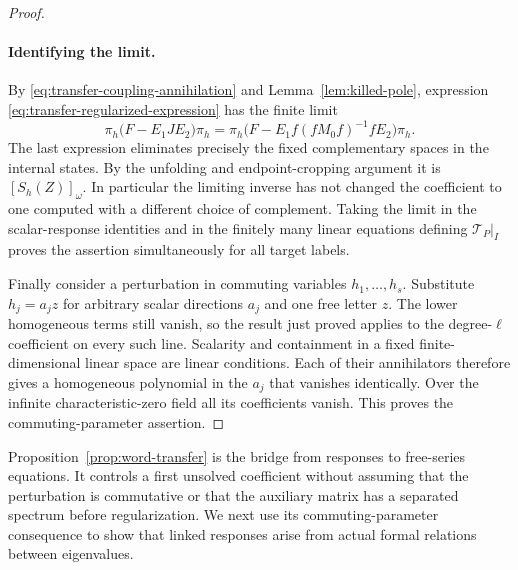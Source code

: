 \begin{proof}
\paragraph{Identifying the limit.}
By \eqref{eq:transfer-coupling-annihilation} and
Lemma~\ref{lem:killed-pole}, expression
\eqref{eq:transfer-regularized-expression} has the finite limit
\[
 \pi_h\bigl(F-E_1JE_2\bigr)\pi_h
 =\pi_h\bigl(F-E_1f(fM_0f)^{-1}fE_2\bigr)\pi_h.
\]
The last expression eliminates precisely the fixed complementary
spaces in the internal states.  By the unfolding and endpoint-cropping
argument it is $[S_h(Z)]_\omega$.  In particular the limiting inverse has
not changed the coefficient to one computed with a different choice of
complement.  Taking the limit in the scalar-response identities and in
the finitely many linear equations defining $\mathcal T_P|_I$ proves
the assertion simultaneously for all target labels.

Finally consider a perturbation in commuting variables $h_1,\ldots,h_s$.
Substitute $h_j=a_jz$ for arbitrary scalar directions $a_j$ and one free
letter $z$.  The lower homogeneous terms still vanish, so the result
just proved applies to the degree-$\ell$ coefficient on every such
line.  Scalarity and containment in a fixed finite-dimensional linear
space are linear conditions.  Each of their annihilators therefore
gives a homogeneous polynomial in the $a_j$ that vanishes identically.
Over the infinite characteristic-zero field all its coefficients vanish.
This proves the commuting-parameter assertion.
\end{proof}

Proposition~\ref{prop:word-transfer} is the bridge from responses to
free-series equations.  It controls a first unsolved coefficient without
assuming that the perturbation is commutative or that the auxiliary
matrix has a separated spectrum before regularization.  We next use its
commuting-parameter consequence to show that linked responses arise from
actual formal relations between eigenvalues.
